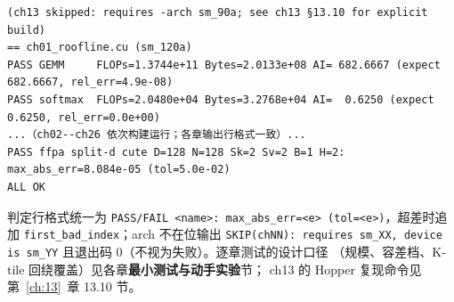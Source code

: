 \begin{lstlisting}[style=console]
(ch13 skipped: requires -arch sm_90a; see ch13 §13.10 for explicit build)
== ch01_roofline.cu (sm_120a)
PASS GEMM     FLOPs=1.3744e+11 Bytes=2.0133e+08 AI= 682.6667 (expect  682.6667, rel_err=4.9e-08)
PASS softmax  FLOPs=2.0480e+04 Bytes=3.2768e+04 AI=  0.6250 (expect    0.6250, rel_err=0.0e+00)
...（ch02--ch26 依次构建运行；各章输出行格式一致）...
PASS ffpa split-d cute D=128 N=128 Sk=2 Sv=2 B=1 H=2: max_abs_err=8.084e-05 (tol=5.0e-02)
ALL OK
\end{lstlisting}

\noindent 判定行格式统一为
\texttt{PASS/\allowbreak{}FAIL \allowbreak{}<name>: max\_\allowbreak{}abs\_\allowbreak{}err=\allowbreak{}<e> \allowbreak{}(tol=\allowbreak{}<e>)}，超差时追加
\texttt{first\_\allowbreak{}bad\_\allowbreak{}index}；arch 不在位输出 \texttt{SKIP(chNN): requires
sm\_XX, device is sm\_YY} 且退出码 0（不视为失败）。逐章测试的设计口径
（规模、容差档、K-tile 回绕覆盖）见各章\textbf{最小测试与动手实验}节；
ch13 的 Hopper 复现命令见第~\ref{ch:13}~章 13.10 节。
